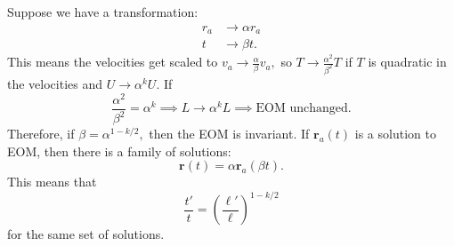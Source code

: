 \documentclass{article}
\numberwithin{equation}{section}
\begin{document}
Suppose we have a transformation:
\begin{align*}
    r_a &\to \alpha r_a \\ 
    t &\to \beta t.
\end{align*}
This means the velocities get scaled to $v_a \to \frac{\alpha}{\beta}v_a,$ so $T \to \frac{\alpha^2}{\beta^2}T$ if $T$ is quadratic in the velocities and $U \to \alpha^k U.$ If 
\begin{equation*}
    \frac{\alpha^2}{\beta^2} = \alpha^k \implies L \to \alpha^k L \implies \text{EOM unchanged.}
\end{equation*}
Therefore, if $\beta = \alpha^{1-k/2},$ then the EOM is invariant. If $\bm{r}_a(t)$ is a solution to EOM, then there is a family of solutions:
\begin{equation*}
    \bm{r}(t) = \alpha \bm{r}_a(\beta t).
\end{equation*}
This means that
\begin{equation*}
    \frac{t'}{t} = \left(\frac{\ell'}{\ell}\right)^{1-k/2}
\end{equation*}
for the same set of solutions.
\end{document}
